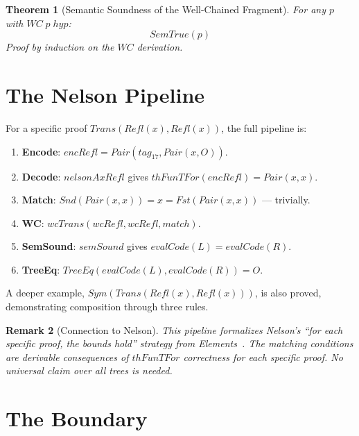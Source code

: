\documentclass[11pt]{article}
\newtheorem{theorem}{Theorem}
\newtheorem{remark}[theorem]{Remark}
\begin{document}
\begin{theorem}[Semantic Soundness of the Well-Chained Fragment]
\label{thm:semsound}
For any $p$ with $\mathit{WC}\;p\;\mathit{hyp}$:
\[
  \mathit{SemTrue}(p)
\]
Proof by induction on the $\mathit{WC}$ derivation.
\end{theorem}

\section{The Nelson Pipeline}

For a specific proof $\mathit{Trans}(\mathit{Refl}(x),
\mathit{Refl}(x))$, the full pipeline is:

\begin{enumerate}
\item \textbf{Encode}: $\mathit{encRefl} = \mathit{Pair}(\mathit{tag}_{17},
  \mathit{Pair}(x, O))$.
\item \textbf{Decode}: $\mathit{nelsonAxRefl}$ gives
  $\mathit{thFunTFor}(\mathit{encRefl}) = \mathit{Pair}(x, x)$.
\item \textbf{Match}: $\mathit{Snd}(\mathit{Pair}(x,x)) = x =
  \mathit{Fst}(\mathit{Pair}(x,x))$ --- trivially.
\item \textbf{WC}: $\mathit{wcTrans}(\mathit{wcRefl}, \mathit{wcRefl},
  \mathit{match})$.
\item \textbf{SemSound}: $\mathit{semSound}$ gives
  $\mathit{evalCode}(L) = \mathit{evalCode}(R)$.
\item \textbf{TreeEq}: $\mathit{TreeEq}(\mathit{evalCode}(L),
  \mathit{evalCode}(R)) = O$.
\end{enumerate}

A deeper example, $\mathit{Sym}(\mathit{Trans}(\mathit{Refl}(x),
\mathit{Refl}(x)))$, is also proved, demonstrating composition
through three rules.

\begin{remark}[Connection to Nelson]
This pipeline formalizes Nelson's ``for each specific proof, the
bounds hold'' strategy from \emph{Elements}~\cite{nelson-elements}.
The matching conditions are \emph{derivable consequences} of
$\mathit{thFunTFor}$ correctness for each specific proof.
No universal claim over all trees is needed.
\end{remark}

\section{The Boundary}
\end{document}
